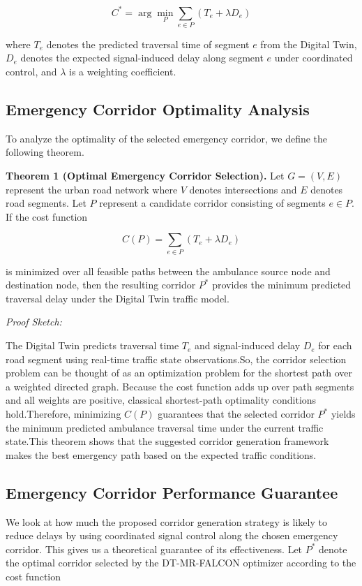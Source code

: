 \documentclass[conference]{IEEEtran}
\begin{document}
\begin{equation}
C^{*} = \arg\min_{P} \sum_{e \in P} (T_e + \lambda D_e)
\end{equation}

where $T_e$ denotes the predicted traversal time of segment $e$ from the Digital Twin, $D_e$ denotes the expected signal-induced delay along segment $e$ under coordinated control, and $\lambda$ is a weighting coefficient.

\subsection*{Emergency Corridor Optimality Analysis}

To analyze the optimality of the selected emergency corridor, we define the following theorem.

\textbf{Theorem 1 (Optimal Emergency Corridor Selection).}
Let $G=(V,E)$ represent the urban road network where $V$ denotes intersections and $E$ denotes road segments.
Let $P$ represent a candidate corridor consisting of segments $e \in P$.
If the cost function

\[
C(P)=\sum_{e\in P}(T_e+\lambda D_e)
\]

is minimized over all feasible paths between the ambulance source node and destination node, then the resulting corridor $P^*$ provides the minimum predicted traversal delay under the Digital Twin traffic model.

\textit{Proof Sketch:}

The Digital Twin predicts traversal time $T_e$ and signal-induced delay $D_e$ for each road segment using real-time traffic state observations.So, the corridor selection problem can be thought of as an optimization problem for the shortest path over a weighted directed graph.
Because the cost function adds up over path segments and all weights are positive, classical shortest-path optimality conditions hold.Therefore, minimizing $C(P)$ guarantees that the selected corridor $P^*$ yields the minimum predicted ambulance traversal time under the current traffic state.This theorem shows that the suggested corridor generation framework makes the best emergency path based on the expected traffic conditions.

\subsection{Emergency Corridor Performance Guarantee}

We look at how much the proposed corridor generation strategy is likely to reduce delays by using coordinated signal control along the chosen emergency corridor. This gives us a theoretical guarantee of its effectiveness.
Let $P^*$ denote the optimal corridor selected by the DT-MR-FALCON optimizer according to the cost function
\end{document}
